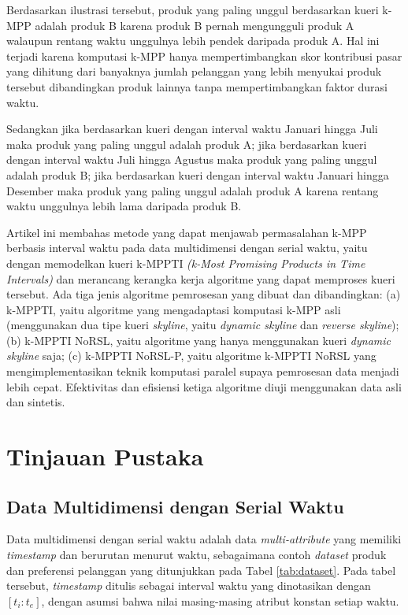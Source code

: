 \documentclass[conference]{IEEEtran}
\begin{document}
Berdasarkan ilustrasi tersebut, produk yang paling unggul berdasarkan kueri k-MPP adalah produk B karena produk B pernah mengungguli produk A walaupun rentang waktu unggulnya lebih pendek daripada produk A. Hal ini terjadi karena komputasi k-MPP hanya mempertimbangkan skor kontribusi pasar yang dihitung dari banyaknya jumlah pelanggan yang lebih menyukai produk tersebut dibandingkan produk lainnya tanpa mempertimbangkan faktor durasi waktu.

Sedangkan jika berdasarkan kueri dengan interval waktu Januari hingga Juli maka produk yang paling unggul adalah produk A; jika berdasarkan kueri dengan interval waktu Juli hingga Agustus maka produk yang paling unggul adalah produk B; jika berdasarkan kueri dengan interval waktu Januari hingga Desember maka produk yang paling unggul adalah produk A karena rentang waktu unggulnya lebih lama daripada produk B.

Artikel ini membahas metode yang dapat menjawab permasalahan k-MPP berbasis interval waktu pada data multidimensi dengan serial waktu, yaitu dengan memodelkan kueri k-MPPTI \textit{(k-Most Promising Products in Time Intervals)} dan merancang kerangka kerja algoritme yang dapat memproses kueri tersebut. Ada tiga jenis algoritme pemrosesan yang dibuat dan dibandingkan: (a) k-MPPTI, yaitu algoritme yang mengadaptasi komputasi k-MPP asli (menggunakan dua tipe kueri \textit{skyline}, yaitu \textit{dynamic skyline} dan \textit{reverse skyline}); (b) k-MPPTI NoRSL, yaitu algoritme yang hanya menggunakan kueri \textit{dynamic skyline} saja; (c) k-MPPTI NoRSL-P, yaitu algoritme k-MPPTI NoRSL yang mengimplementasikan teknik komputasi paralel supaya pemrosesan data menjadi lebih cepat. Efektivitas dan efisiensi ketiga algoritme diuji menggunakan data asli dan sintetis.

\section{Tinjauan Pustaka}
\subsection{Data Multidimensi dengan Serial Waktu}
Data multidimensi dengan serial waktu adalah data \textit{multi-attribute} yang memiliki \textit{timestamp} dan berurutan menurut waktu, sebagaimana contoh \textit{dataset} produk dan preferensi pelanggan yang ditunjukkan pada Tabel \ref{tab:dataset}. Pada tabel tersebut, \textit{timestamp} ditulis sebagai interval waktu yang dinotasikan dengan $[t_i:t_e]$, dengan asumsi bahwa nilai masing-masing atribut konstan setiap waktu. 
\end{document}
